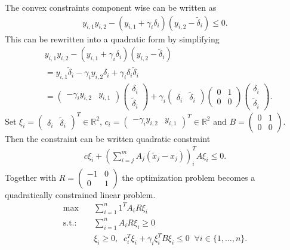 The convex constraints component wise can be written as
\begin{align}
    y_{i,1}y_{i,2} - (y_{i,1}+\gamma_i \delta_i)(y_{i,2}-\tilde{\delta}_i)
    \le 0.
\end{align}
This can be rewritten into a quadratic form by simplifying
\begin{align}
    &y_{i,1}y_{i,2} - (y_{i,1}+\gamma_i \delta_i)(y_{i,2}-\tilde{\delta}_i) \\
    &=y_{i,1}\tilde{\delta}_i - \gamma_i y_{i,2}\delta_i +
    \gamma_i\delta_i\tilde{\delta}_i \\
    & =
    \begin{pmatrix} -\gamma_i y_{i,2} & y_{i,1} \end{pmatrix}
    \begin{pmatrix} \delta_i \\ \tilde{\delta}_i \end{pmatrix}
    +\gamma_i
    \begin{pmatrix} \delta_i & \tilde{\delta}_i \end{pmatrix}
   \begin{pmatrix} 0 & 1 \\ 0 & 0 \end{pmatrix}
    \begin{pmatrix} \delta_i \\ \tilde{\delta}_i \end{pmatrix}.
\end{align}
Set $\xi_i = \begin{pmatrix} \delta_i & \tilde{\delta}_i\end{pmatrix} ^{T}
\in \mathbb{R}^{2}$, $c_i = \begin{pmatrix} -\gamma_iy_{i,2}&
    y_{i,1}\end{pmatrix}^{T} \in \mathbb{R}^{2}$ and $B = \begin{pmatrix} 0 &
1\\ 0 & 0\end{pmatrix}$. Then the constraint can be written quadratic
constraint
\begin{align}
    c\xi_i + \left(\sum_{i=j}^{m} A_j(\tilde{x}_j-x_j)\right)_i^{T} A\xi_i \le 0.
\end{align}
Together with $R = \begin{pmatrix} -1 & 0 \\ 0 & 1 \end{pmatrix}$ the
optimization problem becomes a quadratically constrained linear problem.
\begin{align}
    \text{max} \quad & \sum_{i=1}^{n}1^{T}A_iR\xi_i \label{eq: quadratically_constrained}\\
    \text{s.t.:}\quad
          & \sum_{i=1}^{n}A_iR\xi_i \ge 0 \\
          & \xi_i \ge 0, \;\;
          c_i^{T} \xi_i + \gamma_i \xi_i^{T} B\xi_i \le 0
          \;\; \forall i \in \{1,\ldots,n\}.
\end{align}
